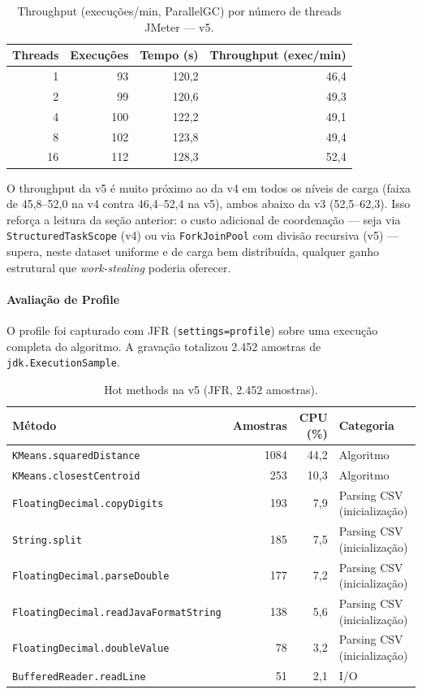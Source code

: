 \begin{table}[H]
\centering
\begin{tabular}{rrrr}
\hline
\textbf{Threads} & \textbf{Execuções} & \textbf{Tempo (s)} & \textbf{Throughput (exec/min)} \\
\hline
1  &  93 & 120{,}2 & 46{,}4 \\
2  &  99 & 120{,}6 & 49{,}3 \\
4  & 100 & 122{,}2 & 49{,}1 \\
8  & 102 & 123{,}8 & 49{,}4 \\
16 & 112 & 128{,}3 & 52{,}4 \\
\hline
\end{tabular}
\caption{Throughput (execuções/min, ParallelGC) por número de threads JMeter --- v5.}
\label{tab:jmeter-v5}
\end{table}

O throughput da v5 é muito próximo ao da v4 em todos os níveis de carga
(faixa de 45,8--52,0 na v4 contra 46,4--52,4 na v5), ambos abaixo da v3
(52,5--62,3). Isso reforça a leitura da seção anterior: o custo adicional
de coordenação --- seja via \texttt{StructuredTaskScope} (v4) ou via
\texttt{ForkJoinPool} com divisão recursiva (v5) --- supera, neste
dataset uniforme e de carga bem distribuída, qualquer ganho estrutural
que \textit{work-stealing} poderia oferecer.

\paragraph{Avaliação de Profile}

O profile foi capturado com JFR (\texttt{settings=profile}) sobre uma
execução completa do algoritmo. A gravação totalizou 2.452 amostras de
\texttt{jdk.ExecutionSample}.

\begin{table}[H]
\centering
\small
\begin{tabular}{p{7.4cm}rrp{3cm}}
\hline
\textbf{Método} & \textbf{Amostras} & \textbf{CPU (\%)} & \textbf{Categoria} \\
\hline
\texttt{KMeans.squaredDistance}       & 1084 & 44{,}2 & Algoritmo \\
\texttt{KMeans.closestCentroid}       &  253 & 10{,}3 & Algoritmo \\
\texttt{FloatingDecimal.copyDigits}   &  193 &  7{,}9 & Parsing CSV (inicialização) \\
\texttt{String.split}                 &  185 &  7{,}5 & Parsing CSV (inicialização) \\
\texttt{FloatingDecimal.parseDouble}  &  177 &  7{,}2 & Parsing CSV (inicialização) \\
\texttt{FloatingDecimal.readJavaFormatString} &  138 &  5{,}6 & Parsing CSV (inicialização) \\
\texttt{FloatingDecimal.doubleValue}  &   78 &  3{,}2 & Parsing CSV (inicialização) \\
\texttt{BufferedReader.readLine}      &   51 &  2{,}1 & I/O \\
\hline
\end{tabular}
\caption{Hot methods na v5 (JFR, 2.452 amostras).}
\label{tab:jfr-hot-v5}
\end{table}

